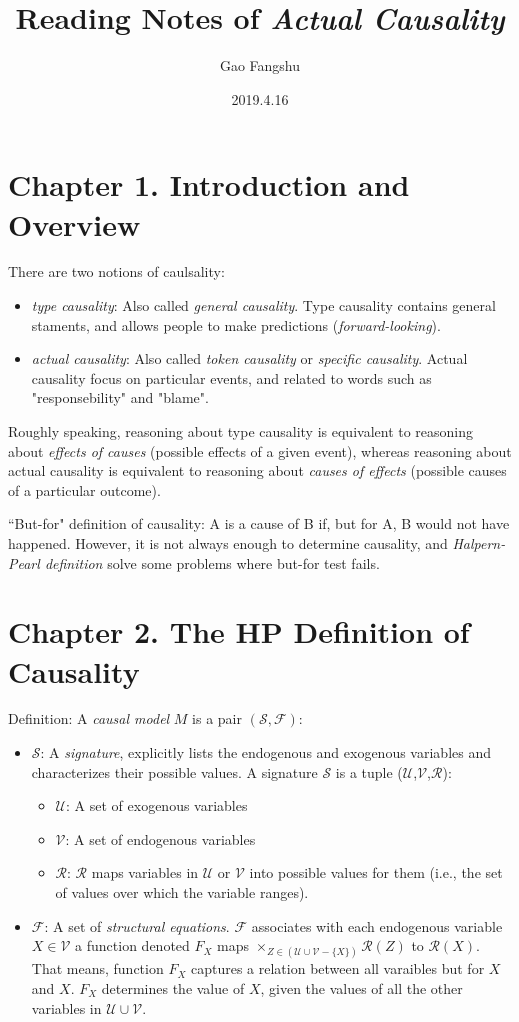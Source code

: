 \documentclass{article}
\title{Reading Notes of \textit{Actual Causality}}
\author{Gao Fangshu}
\date{2019.4.16}
\begin{document}
\maketitle
\section*{Chapter 1. Introduction and Overview}
There are two notions of caulsality:
\begin{itemize}
\item \textit{type causality}: Also called \textit{general causality}. Type causality contains general staments, and allows people to make predictions (\textit{forward-looking}). 
\item \textit{actual causality}: Also called \textit{token causality} or \textit{specific causality}. Actual causality focus on particular events, and related to words such as "responsebility" and "blame".
\end{itemize}

Roughly speaking, reasoning about type causality is equivalent to reasoning about \textit{effects of causes} (possible effects of a given event), whereas reasoning about actual causality is equivalent to reasoning about \textit{causes of effects} (possible causes of a particular outcome).

``But-for" definition of causality: A is a cause of B if, but for A, B would not have happened. However, it is not always enough to determine causality, and \textit{Halpern-Pearl definition} solve some problems where but-for test fails.

\section*{Chapter 2. The HP Definition of Causality}
Definition: A \textit{causal model} $M$ is a pair $(\mathcal{S}, \mathcal{F})$:
\begin{itemize}
	\item $\mathcal{S}$: A \textit{signature}, explicitly lists the endogenous and exogenous variables and characterizes their possible values. A signature $\mathcal{S}$ is a tuple ($\mathcal{U}$,$\mathcal{V}$,$\mathcal{R}$):
	\begin{itemize}
		\item $\mathcal{U}$: A set of exogenous variables
		\item $\mathcal{V}$: A set of endogenous variables
		\item $\mathcal{R}$: $\mathcal{R}$ maps variables in $\mathcal{U}$ or $\mathcal{V}$ into possible values for them (i.e., the set of values over which the variable ranges).
	\end{itemize}
	\item $\mathcal{F}$: A set of \textit{structural equations}. $\mathcal{F}$ associates with each endogenous variable $X \in \mathcal{V}$ a function denoted $F_{X}$ maps $\times_{Z \in(\mathcal{U} \cup \mathcal{V}-\{X\})} \mathcal{R}(Z)$ to $\mathcal{R}(X)$. That means, function $F_{X}$ captures a relation between all varaibles but for $X$ and $X$. $F_{X}$ determines the value of $X$, given the values of all the other variables in $\mathcal{U} \cup \mathcal{V}$. 
\end{itemize}
\end{document}
